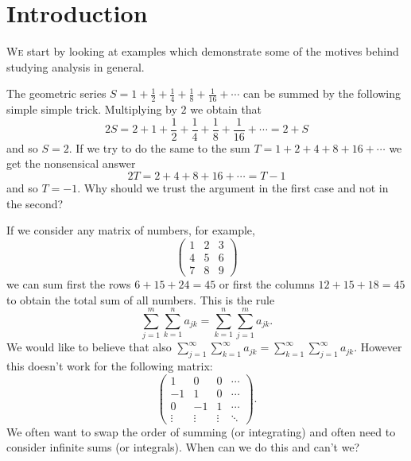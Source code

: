 \chapter{Introduction}

\lettrine{W}{e} start by looking at examples which demonstrate some of the motives behind studying analysis in general.
%
\begin{example*}[Series]
  The geometric series
  \(S = 1 + \frac{1}{2} + \frac{1}{4} + \frac{1}{8} + \frac{1}{16} + \cdots\)
  can be summed by the following simple simple trick.
  Multiplying by \(2\) we obtain that
  \[
    2S = 2 + 1 + \frac{1}{2} + \frac{1}{4} + \frac{1}{8} + \frac{1}{16} + \cdots = 2+S
  \]
  and so \(S=2\).
  If we try to do the same to the sum
  \(T = 1 + 2 + 4 + 8 + 16 + \cdots\)
  we get the nonsensical answer
  \[
    2T = 2 + 4 + 8 + 16 + \cdots = T -1
  \]
  and so \(T = -1\).
  Why should we trust the argument in the first case and not in the second?
\end{example*}


\begin{example*}
  If we consider any matrix of numbers, for example,
  \[
    \begin{pmatrix}
      1 & 2 & 3 \\
      4 & 5 & 6 \\
      7 & 8 & 9
    \end{pmatrix}
  \]
  we can sum first the rows \(6 + 15 + 24 = 45\) or first the columns \(12 + 15 + 18 = 45\) to obtain the total sum of all numbers.
  This is the rule
  \[
    \sum_{j=1}^{m} \sum_{k=1}^{n} a_{jk} = \sum_{k=1}^{n} \sum_{j=1}^{m}  a_{jk}.
  \]
  We would like to believe that also \(\sum_{j=1}^{\infty} \sum_{k=1}^{\infty} a_{jk} = \sum_{k=1}^{\infty} \sum_{j=1}^{\infty}  a_{jk}\).
  However this doesn't work for the following matrix:
  \[
    \begin{pmatrix}
      1      & 0      & 0      & \cdots \\
      -1     & 1      & 0      & \cdots \\
      0      & -1     & 1      & \cdots \\
      \vdots & \vdots & \vdots & \ddots
    \end{pmatrix}.
  \]
  We often want to swap the order of summing (or integrating) and often need to consider infinite sums (or integrals).
  When can we do this and can't we?
\end{example*}

